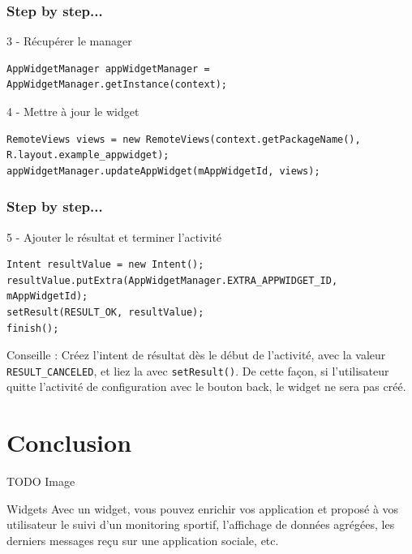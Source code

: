 \documentclass{beamer}
\begin{document}
\begin{frame}[fragile]
\frametitle{Step by step...}

\begin{block}{3 - Récupérer le manager}
\begin{lstlisting}
AppWidgetManager appWidgetManager = AppWidgetManager.getInstance(context);
\end{lstlisting}
\end{block}

\begin{block}{4 - Mettre à jour le widget}
\begin{lstlisting}
RemoteViews views = new RemoteViews(context.getPackageName(),
R.layout.example_appwidget);
appWidgetManager.updateAppWidget(mAppWidgetId, views);
\end{lstlisting}
\end{block}

\end{frame}

\begin{frame}[fragile]
\frametitle{Step by step...}

\begin{block}{5 - Ajouter le résultat et terminer l'activité}
\begin{lstlisting}
Intent resultValue = new Intent();
resultValue.putExtra(AppWidgetManager.EXTRA_APPWIDGET_ID, mAppWidgetId);
setResult(RESULT_OK, resultValue);
finish();
\end{lstlisting}
\end{block}

\begin{block}{Conseille :}
Créez l'intent de résultat dès le début de l'activité, avec la valeur \verb!RESULT_CANCELED!, et liez la avec \verb!setResult()!. De cette façon, si l'utilisateur quitte l'activité de configuration avec le bouton back, le widget ne sera pas créé.
\end{block}

\end{frame}


\section{Conclusion}

\begin{frame}
TODO Image
\begin{block}{Widgets}
Avec un widget, vous pouvez enrichir vos application et proposé à vos utilisateur le suivi d'un monitoring sportif, l'affichage de données agrégées, les derniers messages reçu sur une application sociale, etc.
\end{block}

\end{frame}
\end{document}
